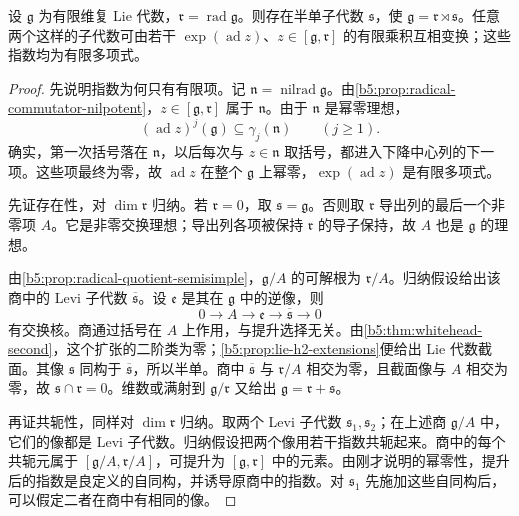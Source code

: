 \begin{theorem}\label{b5:thm:levi-malcev}
	设 \(\mathfrak g\) 为有限维复 Lie 代数，\(\mathfrak r=\operatorname{rad}\mathfrak g\)。则存在半单子代数 \(\mathfrak s\)，使 \(\mathfrak g=\mathfrak r\rtimes\mathfrak s\)。任意两个这样的子代数可由若干 \(\exp(\operatorname{ad}z)\)、\(z\in[\mathfrak g,\mathfrak r]\) 的有限乘积互相变换；这些指数均为有限多项式。
\end{theorem}
\begin{proof}
	先说明指数为何只有有限项。记 \(\mathfrak n=\operatorname{nilrad}\mathfrak g\)。由\cref{b5:prop:radical-commutator-nilpotent}，\(z\in[\mathfrak g,\mathfrak r]\) 属于 \(\mathfrak n\)。由于 \(\mathfrak n\) 是幂零理想，
	\[
		(\operatorname{ad}z)^j(\mathfrak g)\subseteq\gamma_j(\mathfrak n) \qquad(j\ge1).
	\]
	确实，第一次括号落在 \(\mathfrak n\)，以后每次与 \(z\in\mathfrak n\) 取括号，都进入下降中心列的下一项。这些项最终为零，故 \(\operatorname{ad}z\) 在整个 \(\mathfrak g\) 上幂零，\(\exp(\operatorname{ad}z)\) 是有限多项式。

	先证存在性，对 \(\dim\mathfrak r\) 归纳。若 \(\mathfrak r=0\)，取 \(\mathfrak s=\mathfrak g\)。否则取 \(\mathfrak r\) 导出列的最后一个非零项 \(A\)。它是非零交换理想；导出列各项被保持 \(\mathfrak r\) 的导子保持，故 \(A\) 也是 \(\mathfrak g\) 的理想。

	由\cref{b5:prop:radical-quotient-semisimple}，\(\mathfrak g/A\) 的可解根为 \(\mathfrak r/A\)。归纳假设给出该商中的 Levi 子代数 \(\overline{\mathfrak s}\)。设 \(\mathfrak e\) 是其在 \(\mathfrak g\) 中的逆像，则
	\[
		0\longrightarrow A\longrightarrow\mathfrak e \longrightarrow\overline{\mathfrak s}\longrightarrow0
	\]
	有交换核。商通过括号在 \(A\) 上作用，与提升选择无关。由\cref{b5:thm:whitehead-second}，这个扩张的二阶类为零；\cref{b5:prop:lie-h2-extensions}便给出 Lie 代数截面。其像 \(\mathfrak s\) 同构于 \(\overline{\mathfrak s}\)，所以半单。商中 \(\overline{\mathfrak s}\) 与 \(\mathfrak r/A\) 相交为零，且截面像与 \(A\) 相交为零，故 \(\mathfrak s\cap\mathfrak r=0\)。维数或满射到 \(\mathfrak g/\mathfrak r\) 又给出 \(\mathfrak g=\mathfrak r+\mathfrak s\)。

	再证共轭性，同样对 \(\dim\mathfrak r\) 归纳。取两个 Levi 子代数 \(\mathfrak s_1,\mathfrak s_2\)；在上述商 \(\mathfrak g/A\) 中，它们的像都是 Levi 子代数。归纳假设把两个像用若干指数共轭起来。商中的每个共轭元属于 \([\mathfrak g/A,\mathfrak r/A]\)，可提升为 \([\mathfrak g,\mathfrak r]\) 中的元素。由刚才说明的幂零性，提升后的指数是良定义的自同构，并诱导原商中的指数。对 \(\mathfrak s_1\) 先施加这些自同构后，可以假定二者在商中有相同的像。


\end{proof}
